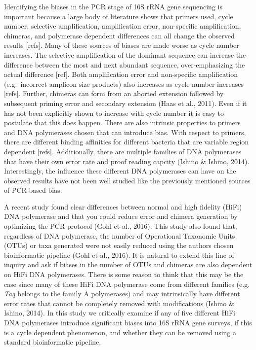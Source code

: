 \documentclass[12pt,]{article}
\begin{document}
Identifying the biases in the PCR stage of 16S rRNA gene sequencing is
important because a large body of literature shows that primers used,
cycle number, selective amplification, amplification error, non-specific
amplification, chimeras, and polymerase dependent differences can all
change the observed results {[}refs{]}. Many of these sources of biases
are made worse as cycle number increases. The selective amplification of
the dominant sequence can increase the difference between the most and
next abundant sequence, over-emphasizing the actual difference
{[}ref{]}. Both amplification error and non-specific amplification
(e.g.~incorrect amplicon size products) also increases as cycle number
increases {[}refs{]}. Further, chimeras can form from an aborted
extension followed by subsequent priming error and secondary extension
(Haas et al., 2011). Even if it has not been explicitly shown to
increase with cycle number it is easy to postulate that this does
happen. There are also intrinsic properties to primers and DNA
polymerases chosen that can introduce bias. With respect to primers,
there are different binding affinities for different bacteria that are
variable region dependent {[}refs{]}. Additionally, there are multiple
families of DNA polymerases that have their own error rate and proof
reading capcity (Ishino \& Ishino, 2014). Interestingly, the influence
these different DNA polymerases can have on the observed results have
not been well studied like the previously mentioned sources of PCR-based
bias.

A recent study found clear differences between normal and high fidelity
(HiFi) DNA polymerase and that you could reduce error and chimera
generation by optimizing the PCR protocol (Gohl et al., 2016). This
study also found that, regardless of DNA polymerase, the number of
Operational Taxonomic Units (OTUs) or taxa generated were not easily
reduced using the authors chosen bioinformatic pipeline (Gohl et al.,
2016). It is natural to extend this line of inquiry and ask if biases in
the number of OTUs and chimeras are also dependent on HiFi DNA
polymerases. There is some reason to think that this may be the case
since many of these HiFi DNA polymerase come from different families
(e.g. \emph{Taq} belongs to the family A polymerases) and may
intrinsically have different error rates that cannot be completely
removed with modifications (Ishino \& Ishino, 2014). In this study we
critically examine if any of five different HiFi DNA polymerases
introduce significant biases into 16S rRNA gene surveys, if this is a
cycle dependent phenomenon, and whether they can be removed using a
standard bioinformatic pipeline.
\end{document}
